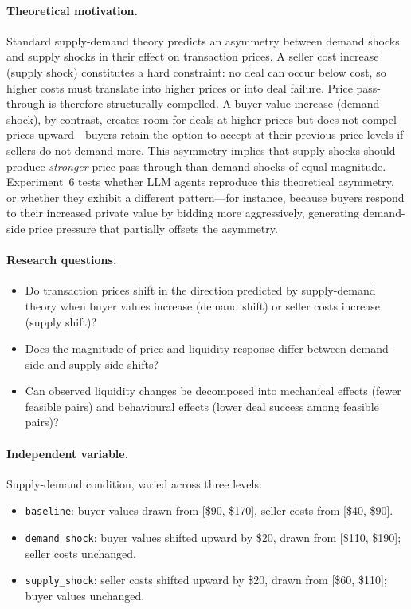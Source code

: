 \paragraph{Theoretical motivation.}
Standard supply-demand theory predicts an asymmetry between demand shocks and supply shocks in their effect on transaction prices.  A seller cost increase (supply shock) constitutes a hard constraint: no deal can occur below cost, so higher costs must translate into higher prices or into deal failure.  Price pass-through is therefore structurally compelled.  A buyer value increase (demand shock), by contrast, creates room for deals at higher prices but does not compel prices upward---buyers retain the option to accept at their previous price levels if sellers do not demand more.  This asymmetry implies that supply shocks should produce \emph{stronger} price pass-through than demand shocks of equal magnitude.  Experiment~6 tests whether LLM agents reproduce this theoretical asymmetry, or whether they exhibit a different pattern---for instance, because buyers respond to their increased private value by bidding more aggressively, generating demand-side price pressure that partially offsets the asymmetry.

\paragraph{Research questions.}
\begin{itemize}
    \item[\textbf{RQ-61.}] Do transaction prices shift in the direction predicted by supply-demand theory when buyer values increase (demand shift) or seller costs increase (supply shift)?
    \item[\textbf{RQ-62.}] Does the magnitude of price and liquidity response differ between demand-side and supply-side shifts?
    \item[\textbf{RQ-63.}] Can observed liquidity changes be decomposed into mechanical effects (fewer feasible pairs) and behavioural effects (lower deal success among feasible pairs)?
\end{itemize}

\paragraph{Independent variable.}
Supply-demand condition, varied across three levels:

\begin{itemize}
    \item \texttt{baseline}: buyer values drawn from [\$90, \$170], seller costs from [\$40, \$90].
    \item \texttt{demand\_shock}: buyer values shifted upward by \$20, drawn from [\$110, \$190]; seller costs unchanged.
    \item \texttt{supply\_shock}: seller costs shifted upward by \$20, drawn from [\$60, \$110]; buyer values unchanged.
\end{itemize}

